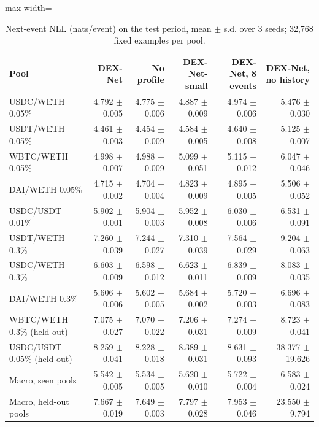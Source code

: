 \documentclass[11pt]{article}
\begin{document}
\begin{table}[t]
\centering
\caption{Next-event NLL (nats/event) on the test period, mean \ensuremath{\pm} s.d. over 3 seeds; 32,768 fixed examples per pool.}\label{tab:2}
\begin{adjustbox}{max width=\linewidth}
\begin{tabular}{lrrrrr}
\toprule
Pool & DEX-Net & No profile & DEX-Net-small & DEX-Net, 8 events & DEX-Net, no history \\
\midrule
USDC/WETH 0.05\% & 4.792 \ensuremath{\pm} 0.005 & 4.775 \ensuremath{\pm} 0.006 & 4.887 \ensuremath{\pm} 0.009 & 4.974 \ensuremath{\pm} 0.006 & 5.476 \ensuremath{\pm} 0.030 \\
USDT/WETH 0.05\% & 4.461 \ensuremath{\pm} 0.003 & 4.454 \ensuremath{\pm} 0.009 & 4.584 \ensuremath{\pm} 0.005 & 4.640 \ensuremath{\pm} 0.008 & 5.125 \ensuremath{\pm} 0.007 \\
WBTC/WETH 0.05\% & 4.998 \ensuremath{\pm} 0.007 & 4.988 \ensuremath{\pm} 0.009 & 5.099 \ensuremath{\pm} 0.051 & 5.115 \ensuremath{\pm} 0.012 & 6.047 \ensuremath{\pm} 0.046 \\
DAI/WETH 0.05\% & 4.715 \ensuremath{\pm} 0.002 & 4.704 \ensuremath{\pm} 0.004 & 4.823 \ensuremath{\pm} 0.009 & 4.895 \ensuremath{\pm} 0.005 & 5.506 \ensuremath{\pm} 0.052 \\
USDC/USDT 0.01\% & 5.902 \ensuremath{\pm} 0.001 & 5.904 \ensuremath{\pm} 0.003 & 5.952 \ensuremath{\pm} 0.008 & 6.030 \ensuremath{\pm} 0.006 & 6.531 \ensuremath{\pm} 0.091 \\
USDT/WETH 0.3\% & 7.260 \ensuremath{\pm} 0.039 & 7.244 \ensuremath{\pm} 0.027 & 7.310 \ensuremath{\pm} 0.039 & 7.564 \ensuremath{\pm} 0.029 & 9.204 \ensuremath{\pm} 0.063 \\
USDC/WETH 0.3\% & 6.603 \ensuremath{\pm} 0.009 & 6.598 \ensuremath{\pm} 0.012 & 6.623 \ensuremath{\pm} 0.011 & 6.839 \ensuremath{\pm} 0.009 & 8.083 \ensuremath{\pm} 0.035 \\
DAI/WETH 0.3\% & 5.606 \ensuremath{\pm} 0.006 & 5.602 \ensuremath{\pm} 0.005 & 5.684 \ensuremath{\pm} 0.002 & 5.720 \ensuremath{\pm} 0.003 & 6.696 \ensuremath{\pm} 0.083 \\
WBTC/WETH 0.3\% (held out) & 7.075 \ensuremath{\pm} 0.027 & 7.070 \ensuremath{\pm} 0.022 & 7.206 \ensuremath{\pm} 0.031 & 7.274 \ensuremath{\pm} 0.009 & 8.723 \ensuremath{\pm} 0.041 \\
USDC/USDT 0.05\% (held out) & 8.259 \ensuremath{\pm} 0.041 & 8.228 \ensuremath{\pm} 0.018 & 8.389 \ensuremath{\pm} 0.031 & 8.631 \ensuremath{\pm} 0.093 & 38.377 \ensuremath{\pm} 19.626 \\
Macro, seen pools & 5.542 \ensuremath{\pm} 0.005 & 5.534 \ensuremath{\pm} 0.005 & 5.620 \ensuremath{\pm} 0.010 & 5.722 \ensuremath{\pm} 0.004 & 6.583 \ensuremath{\pm} 0.024 \\
Macro, held-out pools & 7.667 \ensuremath{\pm} 0.019 & 7.649 \ensuremath{\pm} 0.003 & 7.797 \ensuremath{\pm} 0.028 & 7.953 \ensuremath{\pm} 0.046 & 23.550 \ensuremath{\pm} 9.794 \\
\bottomrule
\end{tabular}
\end{adjustbox}
\end{table}
\end{document}
